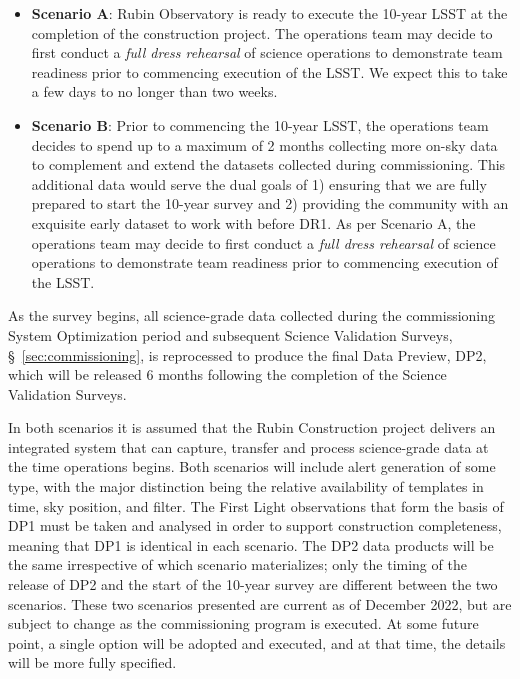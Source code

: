 \begin{itemize}
\item \textbf{Scenario A}:
Rubin Observatory is ready to execute the 10-year LSST at the completion of the construction project. 
The operations team may decide to first conduct a \textit{full dress rehearsal} of science operations to demonstrate team readiness prior to commencing execution of the LSST.
We expect this to take a few days to no longer than two weeks. 

\item \textbf{Scenario B}:
Prior to commencing the 10-year LSST, the operations team decides to spend up to a maximum of 2 months collecting more on-sky data to complement and extend the datasets collected during commissioning. 
This additional data would serve the dual goals of 1) ensuring that we are fully prepared to start the 10-year survey and 2) providing the community with an exquisite early dataset to work with before DR1. 
As per Scenario A, the operations team may decide to first conduct a \textit{full dress rehearsal} of science operations to demonstrate team readiness prior to commencing execution of the LSST. 
\end{itemize}
As the survey begins, all science-grade data collected during the commissioning System Optimization period and subsequent Science Validation Surveys, \S~\ref{sec:commissioning}, is reprocessed to produce the final Data Preview, DP2, which will be released 6 months following the completion of the Science Validation Surveys.

In both scenarios it is assumed that the Rubin Construction project delivers an integrated system that can capture, transfer and process science-grade data at the time operations begins.
Both scenarios will include alert generation of some type, with the major distinction being the relative availability of templates in time, sky position, and filter. 
The First Light observations that form the basis of DP1 must be taken and analysed in order to support construction completeness, meaning that DP1 is identical in each scenario.
The DP2 data products will be the same irrespective of which scenario materializes; only the timing of the release of DP2 and the start of the 10-year survey are different between the two scenarios.
These two scenarios presented are current as of December 2022, but are subject to change as the commissioning program is executed.
At some future point, a single option will be adopted and executed, and at that time, the details will be more fully specified.

